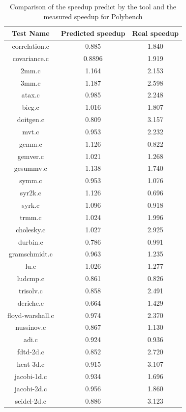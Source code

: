 \begin{table}
\begin{center}
\caption{Comparison of the speedup predict by the tool and the measured speedup for Polybench}
\vspace{0.2cm}
\begin{tabular}{ |c|c|c| } 
 \hline
Test Name & Predicted speedup & Real speedup \\
 \hline
 correlation.c & 0.885 & 1.840 \\
 \hline
  covariance.c & 0.8896 & 1.919 \\
 \hline
  2mm.c & 1.164 & 2.153 \\
 \hline
  3mm.c & 1.187 & 2.598 \\
 \hline
  atax.c & 0.985 & 2.248 \\
 \hline
  bicg.c & 1.016 & 1.807 \\
 \hline
  doitgen.c & 0.809 & 3.157 \\
 \hline
  mvt.c & 0.953 & 2.232 \\
 \hline
  gemm.c & 1.126 & 0.822\\
 \hline
  gemver.c & 1.021 & 1.268 \\
 \hline
  gesummv.c & 1.138 & 1.740 \\
 \hline
  symm.c & 0.953 & 1.076 \\
 \hline
  syr2k.c & 1.126 & 0.696 \\
 \hline
  syrk.c & 1.096 & 0.918 \\
 \hline
  trmm.c & 1.024 & 1.996 \\
 \hline
  cholesky.c & 1.027 & 2.925 \\
 \hline
  durbin.c & 0.786 & 0.991 \\
 \hline
  gramschmidt.c & 0.963 & 1.235 \\
 \hline
  lu.c & 1.026 & 1.277 \\
 \hline
  ludcmp.c & 0.861 & 0.826 \\
 \hline
  trisolv.c & 0.858 & 2.491 \\
 \hline
  deriche.c & 0.664 & 1.429 \\
 \hline
  floyd-warshall.c & 0.974 & 2.370 \\
 \hline
  nussinov.c & 0.867 & 1.130 \\
 \hline
  adi.c & 0.924 & 0.936 \\
 \hline
  fdtd-2d.c & 0.852 & 2.720 \\
 \hline
  heat-3d.c & 0.915 & 3.107 \\
 \hline
  jacobi-1d.c & 0.934 & 1.696 \\
 \hline
  jacobi-2d.c & 0.956 & 1.860 \\
 \hline
  seidel-2d.c & 0.886 & 3.123 \\
 \hline
\end{tabular}
\end{center}
\end{table}
\newpage


